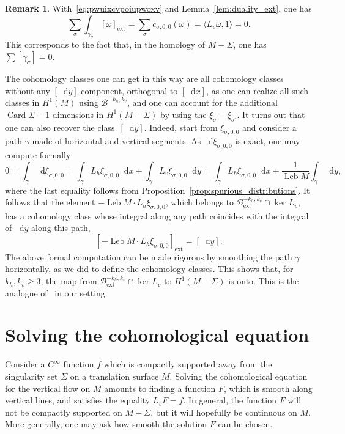 \documentclass[10pt]{amsart}
\newcommand{\ext}{\mathrm{ext}}
\newcommand{\boB}{\mathcal{B}}
\newcommand{\dd}{\mathop{}\!\mathrm{d}}
\DeclareMathOperator{\Card}{Card}
\DeclareMathOperator{\Leb}{Leb}
\theoremstyle{definition}
\newtheorem{rmk}[thm]{Remark}
\numberwithin{equation}{section}
\begin{document}
\begin{rmk}
With~\eqref{eq:pwuixcvpoiupwoxv} and Lemma~\ref{lem:duality_ext}, one has
\begin{equation*}
\sum_{\sigma} \int_{\gamma_\sigma} [\omega]_{\ext}
= \sum_{\sigma} c_{\sigma, 0, 0}(\omega) =
\langle L_v \omega, 1 \rangle
= 0.
\end{equation*}
This corresponds to the fact that, in the homology of $M-\Sigma$, one has
$\sum [\gamma_\sigma] = 0$.

The cohomology classes one can get in this way are all cohomology classes
without any $[\dd y]$ component, \ie orthogonal to $[\dd x]$, as one can
realize all such classes in $H^1(M)$ using $\boB^{-k_h, k_v}$, and one can
account for the additional $\Card \Sigma - 1$ dimensions in $H^1(M-\Sigma)$
by using the $\xi_\sigma - \xi_{\sigma'}$. It turns out that one can also
recover the class~$[\dd y]$. Indeed, start from $\xi_{\sigma, 0, 0}$ and
consider a path $\gamma$ made of horizontal and vertical segments. As $\dd
\xi_{\sigma,0, 0}$ is exact, one may compute formally
\begin{equation*}
0 = \int_\gamma \dd \xi_{\sigma,0, 0}
= \int_\gamma L_h \xi_{\sigma, 0,0} \dd x + \int_{\gamma} L_v \xi_{\sigma, 0, 0} \dd y
= \int_\gamma L_h \xi_{\sigma, 0,0} \dd x + \frac{1}{\Leb M} \int_{\gamma} \dd y,
\end{equation*}
where the last equality follows from
Proposition~\ref{prop:spurious_distributions}. It follows that the element
$-\Leb M \cdot L_h \xi_{\sigma, 0,0}$, which belongs to $\boB^{-k_h,
k_v}_{\ext} \cap \ker L_v$, has a cohomology class whose integral along any
path coincides with the integral of $\dd y$ along this path, \ie
\[
[-\Leb M
\cdot L_h \xi_{\sigma, 0,0}]_{\ext} = [\dd y].
\]
The above formal computation
can be made rigorous by smoothing the path $\gamma$ horizontally, as we did
to define the cohomology classes. This shows that, for $k_h, k_v \geq 3$, the
map from $\boB^{-k_h, k_v}_{\ext} \cap \ker L_v$ to $H^1(M-\Sigma)$ is onto.
This is the analogue of~\cite[Th.\,7.1(ii)]{forni_deviation} in our
setting.
\end{rmk}

\section{Solving the cohomological equation}
\label{sec:cohomological}

Consider a $C^\infty$ function $f$ which is compactly supported away from the
singularity set $\Sigma$ on a translation surface $M$. Solving the
cohomological equation for the vertical flow on $M$ amounts to finding a
function $F$, which is smooth along vertical lines, and satisfies the
equality $L_v F = f$. In general, the function $F$ will not be compactly
supported on $M-\Sigma$, but it will hopefully be continuous on $M$. More
generally, one may ask how smooth the solution $F$ can be chosen.
\end{document}
